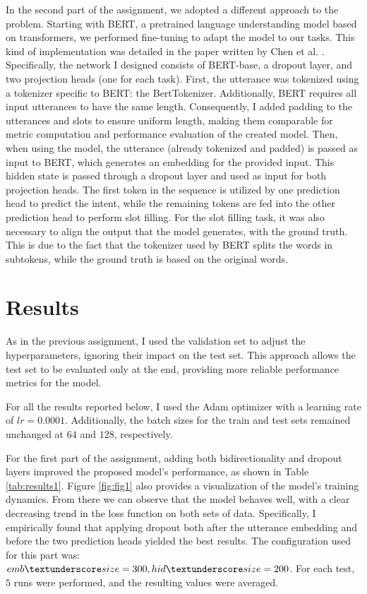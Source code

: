 \documentclass[a4paper]{article}
\begin{document}
In the second part of the assignment, we adopted a different approach to the problem. Starting with BERT, a pretrained language understanding model based on transformers, we performed fine-tuning to adapt the model to our tasks.
This kind of implementation was detailed in the paper written by Chen et al. \cite{BERT}. Specifically, the network I designed consists of BERT-base, a dropout layer, and two projection heads (one for each task).
First, the utterance was tokenized using a tokenizer specific to BERT: the BertTokenizer.
Additionally, BERT requires all input utterances to have the same length. Consequently, I added padding to the utterances and slots to ensure uniform length, making them comparable for metric computation and performance evaluation of the created model.
Then, when using the model, the utterance (already tokenized and padded) is passed as input to BERT, which generates an embedding for the provided input. This hidden state is passed through a dropout layer and used as input for both projection heads. The first token in the sequence is utilized by one prediction head to predict the intent, while the remaining tokens are fed into the other prediction head to perform slot filling.
For the slot filling task, it was also necessary to align the output that the model generates, with the ground truth. This is due to the fact that the tokenizer used by BERT splits the words in subtokens, while the ground truth is based on the original words. 

\section{Results}
As in the previous assignment, I used the validation set to adjust the hyperparameters, ignoring their impact on the test set. This approach allows the test set to be evaluated only at the end, providing more reliable performance metrics for the model.

For all the results reported below, I used the Adam optimizer with a learning rate of \(lr = 0.0001\). Additionally, the batch sizes for the train and test sets remained unchanged at \(64\) and \(128\), respectively.

For the first part of the assignment, adding both bidirectionality and dropout layers improved the proposed model’s performance, as shown in Table \ref{tab:results1}. 
Figure \ref{fig:fig1} also provides a visualization of the model's training dynamics. From there we can observe that the model behaves well, with a clear decreasing trend in the loss function on both sets of data.
Specifically, I empirically found that applying dropout both after the utterance embedding and before the two prediction heads yielded the best results.
The configuration used for this part was: \(emb \textunderscore size=300, hid \textunderscore size=200\).
For each test, \(5\) runs were performed, and the resulting values were averaged.
\end{document}
